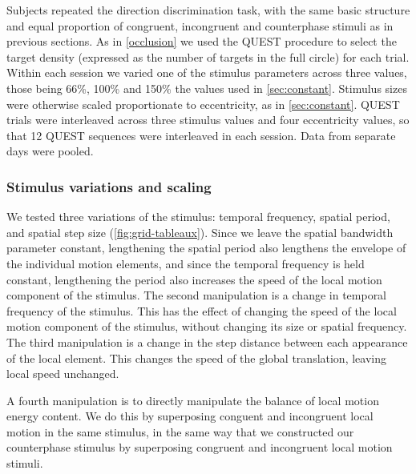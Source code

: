 \documentclass[../manuscript]{subfiles}
\begin{document}
Subjects repeated the direction discrimination task, with the same
basic structure and equal proportion of congruent, incongruent and
counterphase stimuli as in previous sections. As in
\autoref{occlusion} we used the QUEST procedure to select the target
density (expressed as the number of targets in the full circle) for
each trial. Within each session we varied one of the stimulus
parameters across three values, those being 66\%, 100\% and 150\% the
values used in \autoref{sec:constant}. Stimulus sizes were otherwise
scaled proportionate to eccentricity, as in
\autoref{sec:constant}. QUEST trials were interleaved across three
stimulus values and four eccentricity values, so that 12 QUEST
sequences were interleaved in each session. Data from
separate days were pooled.

\subsubsection{Stimulus variations and scaling}
\label{sec:stim-vari-scal}
We tested three variations of the
stimulus: temporal frequency, spatial period, and spatial step size
(\autoref{fig:grid-tableaux}). Since we leave the spatial bandwidth
parameter constant, lengthening the spatial period also lengthens the
envelope of the individual motion elements, and since the temporal
frequency is held constant, lengthening the period also increases the
speed of the local motion component of the stimulus. The second
manipulation is a change in temporal frequency of the stimulus. This
has the effect of changing the speed of the local motion component of
the stimulus, without changing its size or spatial frequency. The
third manipulation is a change in the step distance between each
appearance of the local element. This changes the speed of the global
translation, leaving local speed unchanged. 

 A fourth manipulation is to directly manipulate the
balance of local motion energy content. We do this by superposing
conguent and incongruent local motion in the same
stimulus, in the same way that we constructed our counterphase stimulus by superposing congruent and incongruent local motion stimuli.  
\end{document}
